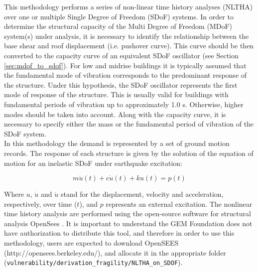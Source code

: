 This methodology performs a series of non-linear time history analyses (NLTHA) over one or multiple Single Degree of Freedom (SDoF) systems. In order to determine the structural capacity of the Multi Degree of Freedom (MDoF) system(s) under analysis, it is necessary to identify the relationship between the base shear and roof displacement (i.e. pushover curve). This curve should be then converted to the capacity curve of an equivalent SDoF oscillator (see Section \ref{sec:mdof_to_sdof}). For low and midrise buildings it is typically assumed that the fundamental mode of vibration corresponds to the predominant response of the structure. Under this hypothesis, the SDoF oscillator represents the first mode of response of the structure. This is usually valid for buildings with fundamental periods of vibration up to approximately 1.0 s. Otherwise, higher modes should be taken into account. Along with the capacity curve, it is necessary to specify either the mass or the fundamental period of vibration of the SDoF system.\\

In this methodology the demand is represented by a set of ground motion records. The response of each structure is given by the solution of the equation of motion for an inelastic SDoF under earthquake excitation:

\begin{equation}
m\ddot{u}(t) + c\dot{u}(t) + ku(t) = p(t)
\end{equation}

Where $u$, $\dot{u}$ and $\ddot{u}$ stand for the displacement, velocity and acceleration, respectively, over time ($t$), and $p$ represents an external excitation. The nonlinear time history analysis are performed using the open-source software for structural analysis OpenSees \citep{McKennaEtAl2000}. It is important to understand the GEM Foundation does not have authorization to distribute this tool, and therefore in order to use this methodology, users are expected to download OpenSEES (http://opensees.berkeley.edu/), and allocate it in the appropriate folder (\verb=vulnerability/derivation_fragility/NLTHA_on_SDOF=).\\

